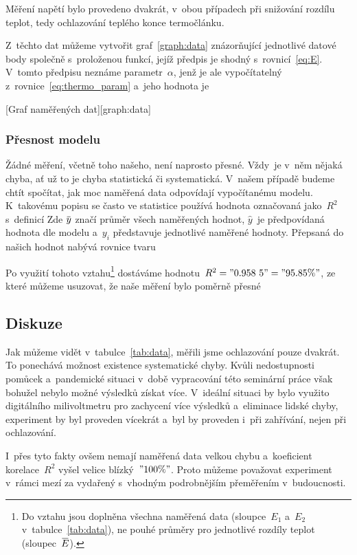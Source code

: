 Měření napětí bylo provedeno dvakrát, v~obou případech při snižování rozdílu 
teplot, tedy ochlazování teplého konce termočlánku.



Z~těchto dat můžeme vytvořit graf~\ref{graph:data} znázorňující jednotlivé 
datové body společně
s~proloženou funkcí, jejíž předpis je shodný s~rovnicí~\ref{eq:E}. 
V~tomto předpisu neznáme parametr~$\alpha$, jenž je ale vypočítatelný
z~rovnice~\ref{eq:thermo_param} a~jeho hodnota je

[Graf naměřených dat][graph:data]

\subsubsection{Přesnost modelu}
\label{sec:presnost}
Žádné měření, včetně toho našeho, není naprosto přesné. Vždy~je v~něm nějaká chyba,
ať už to je chyba statistická či systematická. V~našem případě budeme chtít 
spočítat, jak moc naměřená data odpovídají vypočítanému modelu. K~takovému
popisu se často ve statistice používá hodnota označovaná jako~$R^2$ s~definicí
Zde $\avg y$ značí průměr všech naměřených hodnot, $\hat y$~je předpovídaná
hodnota dle modelu a~$y_i$ představuje jednotlivé naměřené hodnoty. Přepsaná do
našich hodnot nabývá rovnice tvaru

Po využití tohoto vztahu\footnote{Do vztahu jsou doplněna všechna naměřená data
(sloupce~$E_1$ a~$E_2$ v~tabulce~\ref{tab:data}), ne pouhé průměry pro
jednotlivé rozdíly teplot (sloupec~$\avg{E}$).} dostáváme 
hodnotu~$R^2 = "0.958~5" = "95.85 \%"$, ze které můžeme usuzovat, že naše 
měření bylo poměrně přesné

\subsection{Diskuze}
Jak můžeme vidět v~tabulce~\ref{tab:data}, měřili jsme ochlazování pouze
dvakrát. To ponechává možnost existence systematické chyby. Kvůli nedostupnosti
pomůcek a~pandemické situaci v~době vypracování této seminární práce však
bohužel nebylo možné výsledků získat více. V~ideální situaci by bylo využito
digitálního milivoltmetru pro zachycení více výsledků a~eliminace lidské chyby,
experiment by byl proveden vícekrát a~byl by proveden i~při zahřívání, nejen
při ochlazování.

I~přes tyto fakty ovšem nemají naměřená data velkou chybu a~koeficient
korelace~$R^2$ vyšel velice blízký~$"100 \%"$. Proto můžeme považovat
experiment v~rámci mezí za vydařený s~vhodným podrobnějším přeměřením
v~budoucnosti.
